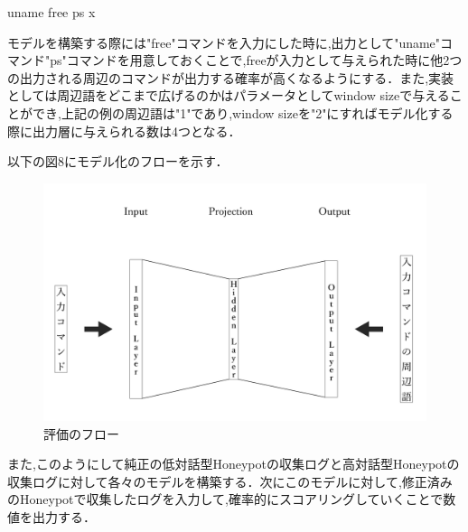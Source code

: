 \vspace{5mm}

\begin{mylisting}[language=sh,caption=3つの実行コマンドの例]
 uname
 free
 ps x
\end{mylisting}
\vspace{5mm}

モデルを構築する際には"free"コマンドを入力にした時に,出力として"uname"コマンド"ps"コマンドを用意しておくことで,freeが入力として与えられた時に他2つの出力される周辺のコマンドが出力する確率が高くなるようにする．また,実装としては周辺語をどこまで広げるのかはパラメータとしてwindow sizeで与えることができ,上記の例の周辺語は"1"であり,window sizeを"2"にすればモデル化する際に出力層に与えられる数は4つとなる．

以下の図8にモデル化のフローを示す．
\vspace{10mm}
\begin{figure}[H]
    \centering
    \includegraphics[width=1.0\textwidth]{figures/model.png}
    \caption{評価のフロー\cite{word2vecpaper}\cite{word2vecpaper2}}
    \label{fig:evo}
\end{figure}
\vspace{10mm}
また,このようにして純正の低対話型Honeypotの収集ログと高対話型Honeypotの収集ログに対して各々のモデルを構築する．次にこのモデルに対して,修正済みのHoneypotで収集したログを入力して,確率的にスコアリングしていくことで数値を出力する．\\

